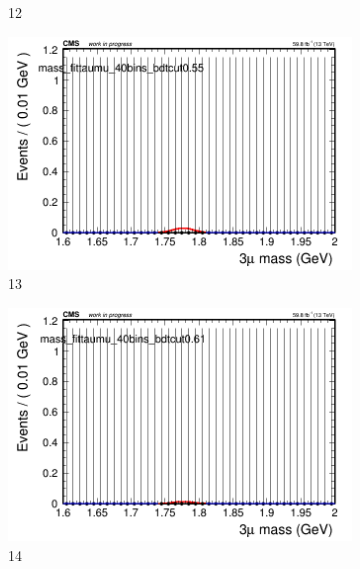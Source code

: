 \begin{figure}[h!]
\begin{subfigure}{0.2\textwidth}
        \caption{12}
    \end{subfigure}
    \begin{subfigure}{0.2\textwidth}
        \includegraphics[width=\textwidth]{power_law/plots/taumu/massfit_taumu_40bins_bdtcut0.55.png}
        \caption{13}
    \end{subfigure}
    \begin{subfigure}{0.2\textwidth}
        \includegraphics[width=\textwidth]{power_law/plots/taumu/massfit_taumu_40bins_bdtcut0.61.png}
        \caption{14}
    \end{subfigure}
    \begin{subfigure}{0.2\textwidth}

\end{subfigure}
\end{figure}
